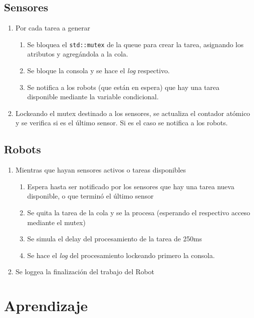 \documentclass{article}
\begin{document}
\begin{multicols}{2}
\subsection{Sensores}
\begin{enumerate}[label=\Roman*.]
    \item Por cada tarea a generar 
    \begin{enumerate}[label=\roman*.]
        \item Se bloquea el \lstinline|std::mutex| de la queue para crear la tarea,
        asignando los atributos y agregándola a la cola.
        \item Se bloque la consola y se hace el \textit{log} respectivo.
        \item Se notifica a los robots (que están en espera) que hay una tarea disponible
        mediante la variable condicional.
    \end{enumerate}
    \item Lockeando el mutex destinado a los sensores, se actualiza el contador atómico y se 
    verifica si es el último sensor. Si es el caso se notifica a los robots.
\end{enumerate}

\subsection{Robots}
\begin{enumerate}[label=\Roman*.]
    \item Mientras que hayan sensores activos o tareas disponibles
    \begin{enumerate}[label=\roman*.]
        \item Espera hasta ser notificado por los sensores que hay una tarea nueva disponible,
        o que terminó el último sensor
        \item Se quita la tarea de la cola y se la procesa (esperando el respectivo acceso mediante
        el mutex)
        \item Se simula el delay del procesamiento de la tarea de 250ms
        \item Se hace el \textit{log} del procesamiento lockeando primero la consola.
    \end{enumerate}
    \item Se loggea la finalización del trabajo del Robot
\end{enumerate}
\section*{Aprendizaje}
\end{multicols}
\end{document}

